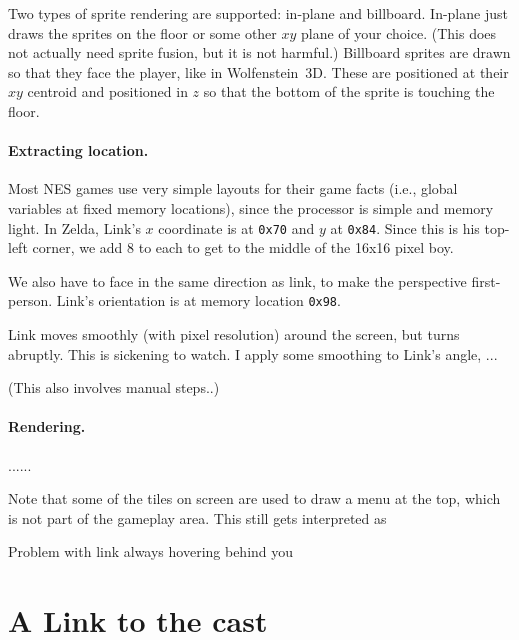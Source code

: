 \documentclass[twocolumn]{article}
\begin{document}

Two types of sprite rendering are supported: in-plane and billboard.
In-plane just draws the sprites on the floor or some other $xy$ plane
of your choice. (This does not actually need sprite fusion, but it is
not harmful.) Billboard sprites are drawn so that they face the
player, like in Wolfenstein~3D. These are positioned at their $xy$
centroid and positioned in $z$ so that the bottom of the sprite is
touching the floor.

\paragraph{Extracting location.}

Most NES games use very simple layouts for their game facts (i.e.,
global variables at fixed memory locations), since the processor is
simple and memory light.\cite{murphy2013first} In Zelda, Link's
$x$ coordinate is at \verb+0x70+ and $y$ at \verb+0x84+. Since this
is his top-left corner, we add 8 to each to get to the middle of the
16x16 pixel boy.

We also have to face in the same direction as link, to make the
perspective first-person. Link's orientation is at memory location
\verb+0x98+.

Link moves smoothly (with pixel resolution) around the screen, but
turns abruptly. This is sickening to watch. I apply some smoothing
to Link's angle, ...

(This also involves manual steps..)

\paragraph{Rendering.}

......

Note that some of the tiles on screen are used to draw a menu at the
top, which is not part of the gameplay area. This still gets interpreted
as 

Problem with link always hovering behind you

\section{A Link to the cast} \label{sec:cast}

\nocite{murphy2013first}



\end{document}
